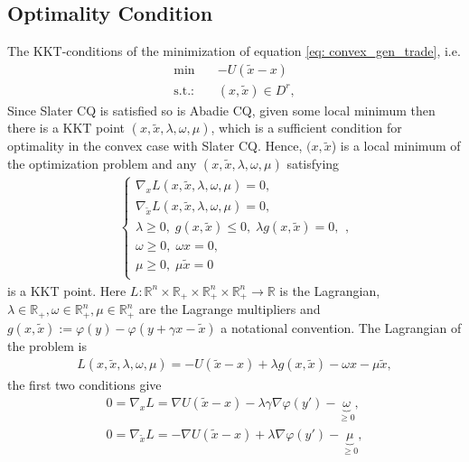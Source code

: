 \subsection{Optimality Condition\label{sec: optimality condition}}
The KKT-conditions of the minimization of
equation \ref{eq: convex_gen_trade}, i.e.
\begin{align}
    \text{min} \quad &-U(\tilde{x}-x)\\
    \text{s.t.:}\quad & (x,\tilde{x}) \in D^{r},
\end{align}
Since Slater CQ is satisfied so is Abadie CQ, given some local minimum then
there is a KKT point $(x , \tilde{x}, \lambda , \omega , \mu)$, which is a
sufficient condition for optimality in the convex case with Slater CQ. Hence, $(x
, \tilde{x}$) is a local minimum of the optimization problem and any
$(x, \tilde{x}, \lambda, \omega, \mu)$ satisfying
\begin{align}
    \begin{cases}
    \nabla_x L(x, \tilde{x}, \lambda, \omega, \mu) = 0,\\
    \nabla_{\tilde{x}} L(x, \tilde{x}, \lambda, \omega, \mu) = 0,\\
    \lambda \ge 0,\; g(x, \tilde{x}) \le 0,\; \lambda g(x, \tilde{x}) = 0,\\
    \omega \ge 0,\; \omega x = 0,\\
    \mu \ge 0,\; \mu \tilde{x} = 0\\
    \end{cases},
\end{align}
is a KKT point.
Here $L:
\mathbb{R}^{n}\times\mathbb{R}_+\times\mathbb{R}_+^{n}\times\mathbb{R}_+^{n}
\to \mathbb{R} $ is the Lagrangian, $\lambda \in \mathbb{R}_+, \omega \in
\mathbb{R}_+^{n}, \mu \in \mathbb{R}_+^{n}$  are the Lagrange multipliers and
$g(x, \tilde{x}) := \varphi(y) - \varphi(y + \gamma x - \tilde{x})$ a
notational convention. The Lagrangian of the problem is
\begin{align}
    L(x, \tilde{x},\lambda, \omega, \mu) = -U(\tilde{x}-x) + \lambda g(x,
    \tilde{x}) - \omega x - \mu \tilde{x},
\end{align}
the first two conditions give
\begin{align}
    0 = \nabla_x L = \nabla U(\tilde{x}-x) - \lambda \gamma \nabla\varphi(y') -
    \underbrace{\omega}_{\ge0},\\
    0 = \nabla_{\tilde{x}} L = - \nabla U(\tilde{x}-x) + \lambda  \nabla\varphi(y') -
    \underbrace{\mu}_{\ge0},
\end{align}
